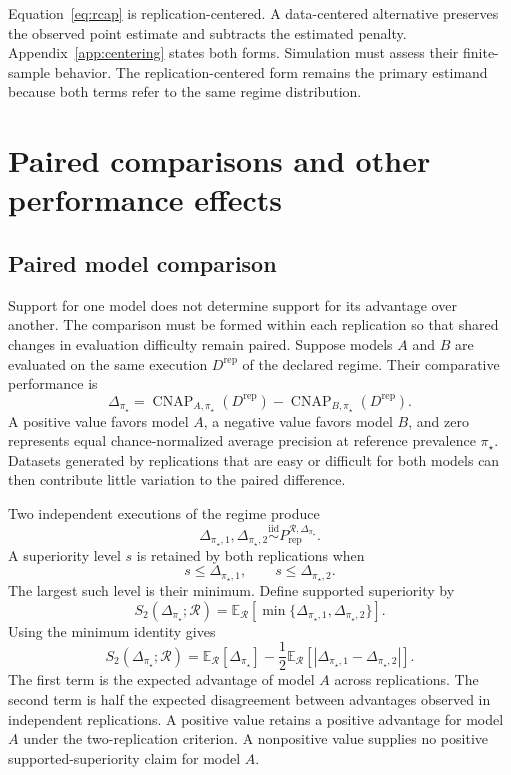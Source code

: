 \documentclass[11pt]{article}
\newcommand{\CNAP}{\operatorname{CNAP}}
\newcommand{\Regime}{\mathcal{R}}
\newcommand{\E}{\mathbb{E}}
\newcommand{\iid}{\mathrel{\overset{\mathrm{iid}}{\sim}}}
\theoremstyle{remark}
\begin{document}
Equation~\eqref{eq:rcap} is replication-centered. A data-centered alternative preserves the observed point estimate and subtracts the estimated penalty. Appendix~\ref{app:centering} states both forms. Simulation must assess their finite-sample behavior. The replication-centered form remains the primary estimand because both terms refer to the same regime distribution.

\section{Paired comparisons and other performance effects}
\label{sec:paired}

\subsection{Paired model comparison}

Support for one model does not determine support for its advantage over another. The comparison must be formed within each replication so that shared changes in evaluation difficulty remain paired. Suppose models $A$ and $B$ are evaluated on the same execution $D^{\mathrm{rep}}$ of the declared regime. Their comparative performance is
\begin{equation}
\Delta_{\pi_\star}
=
\CNAP_{A,\pi_\star}(D^{\mathrm{rep}})
-
\CNAP_{B,\pi_\star}(D^{\mathrm{rep}}).
\label{eq:paired-difference}
\end{equation}
A positive value favors model $A$, a negative value favors model $B$, and zero represents equal chance-normalized average precision at reference prevalence $\pi_\star$. Datasets generated by replications that are easy or difficult for both models can then contribute little variation to the paired difference.

Two independent executions of the regime produce
\[
\Delta_{\pi_\star,1},
\Delta_{\pi_\star,2}
\iid
P_{\mathrm{rep}}^{\Regime,\Delta_{\pi_\star}}.
\]
A superiority level $s$ is retained by both replications when
\[
s\leq \Delta_{\pi_\star,1},
\qquad
s\leq \Delta_{\pi_\star,2}.
\]
The largest such level is their minimum. Define supported superiority by
\begin{equation}
S_2(\Delta_{\pi_\star};\Regime)
=
\E_{\Regime}
\left[
\min\{
\Delta_{\pi_\star,1},
\Delta_{\pi_\star,2}
\}
\right].
\label{eq:paired}
\end{equation}
Using the minimum identity gives
\begin{equation}
S_2(\Delta_{\pi_\star};\Regime)
=
\E_{\Regime}[\Delta_{\pi_\star}]
-
\frac12
\E_{\Regime}
\left[
|\Delta_{\pi_\star,1}-\Delta_{\pi_\star,2}|
\right].
\label{eq:paired-decomposition}
\end{equation}
The first term is the expected advantage of model $A$ across replications. The second term is half the expected disagreement between advantages observed in independent replications. A positive value retains a positive advantage for model $A$ under the two-replication criterion. A nonpositive value supplies no positive supported-superiority claim for model $A$.
\end{document}
